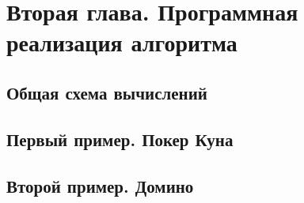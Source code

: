 \chapter{Вторая глава. Программная реализация алгоритма}
\label{cha:ch_2}
\section{Общая схема вычислений}
\section{Первый пример. Покер Куна}
\section{Второй пример. Домино}